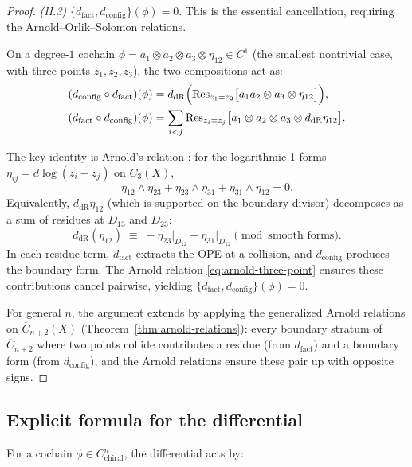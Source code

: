 \begin{proof}
\emph{(II.3)} $\{d_{\text{fact}}, d_{\text{config}}\}(\phi) = 0$.
This is the essential cancellation, requiring the
Arnold--Orlik--Solomon relations.

On a degree-$1$ cochain
$\phi = a_1 \otimes a_2 \otimes a_3 \otimes
\eta_{12} \in C^1$ (the smallest nontrivial case,
with three points $z_1, z_2, z_3$), the two compositions act
as:
\begin{align*}
(d_{\text{config}} \circ d_{\text{fact}})(\phi)
&= d_{\mathrm{dR}}\Bigl(
  \mathrm{Res}_{z_1 = z_2}\bigl[a_1 a_2 \otimes a_3
    \otimes \eta_{12}\bigr] \Bigr), \\
(d_{\text{fact}} \circ d_{\text{config}})(\phi)
&= \sum_{i<j}
  \mathrm{Res}_{z_i = z_j}\bigl[a_1 \otimes a_2 \otimes a_3
    \otimes d_{\mathrm{dR}}\eta_{12}\bigr].
\end{align*}

The key identity is Arnold's relation
\cite{Arnold69}: for the logarithmic 1-forms
$\eta_{ij} = d\log(z_i - z_j)$ on $C_3(X)$,
\begin{equation}\label{eq:arnold-three-point}
\eta_{12} \wedge \eta_{23}
+ \eta_{23} \wedge \eta_{31}
+ \eta_{31} \wedge \eta_{12} = 0.
\end{equation}
Equivalently, $d_{\mathrm{dR}}\eta_{12}$ (which is
supported on the boundary divisor) decomposes as a sum of
residues at $D_{13}$ and $D_{23}$:
\[
d_{\mathrm{dR}}(\eta_{12})
\;\equiv\;
-\eta_{23}\big|_{D_{12}} - \eta_{31}\big|_{D_{12}}
\pmod{\text{smooth forms}}.
\]
In each residue term, $d_{\text{fact}}$ extracts the OPE
at a collision, and $d_{\text{config}}$ produces the
boundary form.  The Arnold relation
\eqref{eq:arnold-three-point} ensures these contributions
cancel pairwise, yielding
$\{d_{\text{fact}}, d_{\text{config}}\}(\phi) = 0$.

For general $n$, the argument extends by applying the
generalized Arnold relations on $\overline{C}_{n+2}(X)$
(Theorem~\ref{thm:arnold-relations}): every boundary
stratum of $\overline{C}_{n+2}$ where two points collide
contributes a residue (from $d_{\text{fact}}$) and a
boundary form (from $d_{\text{config}}$), and the
Arnold relations ensure these pair up with opposite signs.
\end{proof}

\subsection{Explicit formula for the differential}

For a cochain $\phi \in C^n_{\text{chiral}}$, the differential acts by:


